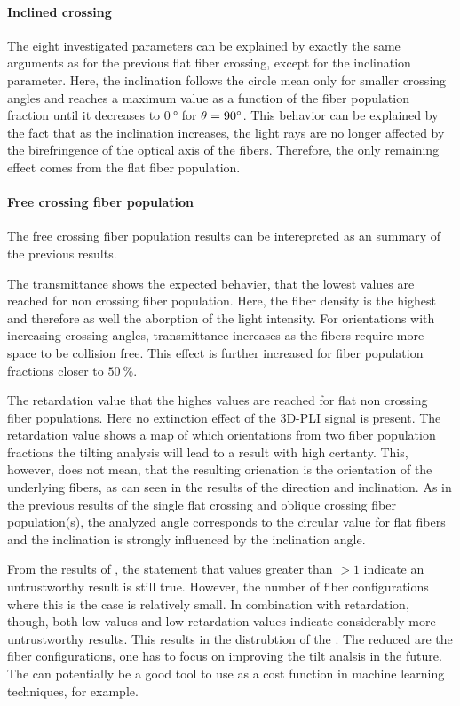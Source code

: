 \paragraph{Inclined crossing}
The eight investigated parameters can be explained by exactly the same arguments as for the previous flat fiber crossing, except for the inclination parameter.
Here, the inclination follows the circle mean only for smaller crossing angles and reaches a maximum value as a function of the fiber population fraction \modelPsi{} until it decreases to $\SI{0}{\degree}$ for $\textnormal{$\theta$} = \SI{90}{\degree}$.
This behavior can be explained by the fact that as the inclination increases, the light rays are no longer affected by the birefringence of the optical axis of the fibers.
Therefore, the only remaining effect comes from the flat fiber population.
% 
% 
% 
\paragraph{Free crossing fiber population}
The free crossing fiber population results can be interepreted as an summary of the previous results.
\par
% 
The transmittance shows the expected behavier, that the lowest values are reached for non crossing fiber population.
Here, the fiber density is the highest and therefore as well the aborption of the light intensity.
For orientations with increasing crossing angles, transmittance increases as the fibers require more space to be collision free.
This effect is further increased for fiber population fractions closer to $\SI{50}{\percent}$.
\par
% 
The retardation value that the highes values are reached for flat non crossing fiber populations.
Here no extinction effect of the \ac{3D-PLI} signal is present.
The retardation value shows a map of which orientations from two fiber population fractions the tilting analysis will lead to a result with high certanty.
This, however, does not mean, that the resulting orienation is the orientation of the underlying fibers, as can seen in the results of the direction and inclination.
As in the previous results of the single flat crossing and oblique crossing fiber population(s), the analyzed angle corresponds to the circular value for flat fibers and the inclination is strongly influenced by the inclination angle.
\par
% 
From the results of \trel{}, the statement that \trel{} values greater than $>1$ indicate an untrustworthy result is still true.
However, the number of fiber configurations where this is the case is relatively small.
In combination with retardation, though, both low \trel{} values and low retardation values indicate considerably more untrustworthy results.
This results in the distrubtion of the \accvalue{}.
The reduced \accvalue{} are the fiber configurations, one has to focus on improving the tilt analsis in the future.
The \accvalue{} can potentially be a good tool to use as a cost function in machine learning techniques, for example.
%
%
%
